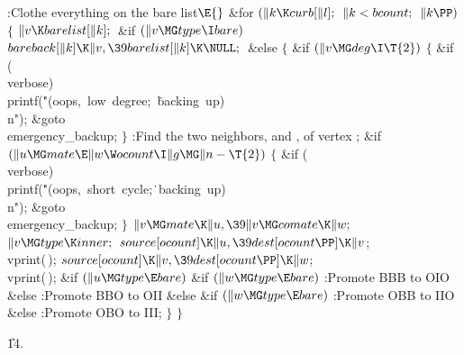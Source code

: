 \Y\B\4:Clothe everything on the bare list\X${}\E{}$\6
\&{for} ${}(\|k\K\\{curb}[\|l];{}$ ${}\|k<\\{bcount};{}$ ${}\|k\PP){}$\5
${}\{{}$\1\6
${}\|v\K\\{barelist}[\|k];{}$\6
\&{if} ${}(\|v\MG\\{type}\I\\{bare}){}$\1\5
${}\\{bareback}[\|k]\K\|v,\39\\{barelist}[\|k]\K\NULL;{}$\2\6
\&{else}\5
${}\{{}$\1\6
\&{if} ${}(\|v\MG\\{deg}\I\T{2}){}$\5
${}\{{}$\1\6
\&{if} (\\{verbose})\1\5
\\{printf}(\.{"(oops,\ low\ degree;\ }\)\.{backing\ up)\\n"});\2\6
\&{goto} \\{emergency\_backup};\6
\4${}\}{}$\2\6
:Find the two neighbors,  and , of vertex \X;\6
\&{if} ${}(\|u\MG\\{mate}\E\|w\W\\{ocount}\I\|g\MG\|n-\T{2}){}$\5
${}\{{}$\1\6
\&{if} (\\{verbose})\1\5
\\{printf}(\.{"(oops,\ short\ cycle;}\)\.{\ backing\ up)\\n"});\2\6
\&{goto} \\{emergency\_backup};\6
\4${}\}{}$\2\6
${}\|v\MG\\{mate}\K\|u,\39\|v\MG\\{comate}\K\|w;{}$\6
${}\|v\MG\\{type}\K\\{inner};{}$\6
${}\\{source}[\\{ocount}]\K\|u,\39\\{dest}[\\{ocount}\PP]\K\|v{}$;\5
\\{vprint}(\,);\6
${}\\{source}[\\{ocount}]\K\|v,\39\\{dest}[\\{ocount}\PP]\K\|w{}$;\5
\\{vprint}(\,);\6
\&{if} ${}(\|u\MG\\{type}\E\\{bare}){}$\1\6
\&{if} ${}(\|w\MG\\{type}\E\\{bare}){}$\1\5
:Promote BBB to OIO\X\2\6
\&{else}\1\5
:Promote BBO to OII\X\2\2\6
\&{else} \&{if} ${}(\|w\MG\\{type}\E\\{bare}){}$\1\5
:Promote OBB to IIO\X\2\6
\&{else}\1\5
:Promote OBO to III\X;\2\6
\4${}\}{}$\2\6
\4${}\}{}$\2\par
\U14.\fi

